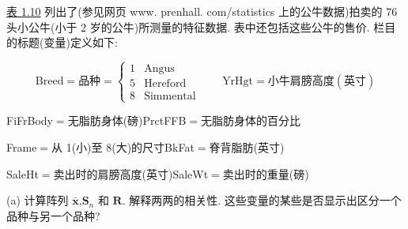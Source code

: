  \hyperref[tab:1.10]{表 1.10} 列出了(参见网页 www. prenhall. com/statistics 上的公牛数据)拍卖的 76 头小公牛(小于 2 岁的公牛)所测量的特征数据. 表中还包括这些公牛的售价. 栏目的标题(变量)定义如下:

\[
\mathrm{Breed}=\text{品种}=\begin{cases} 1 & \text{Angus} \\ 5 & \text{Hereford} \\ 8 & \text{Simmental} \end{cases} \qquad \text{YrHgt}=\text{小牛肩膀高度}(\text{英寸})
\]

FiFrBody$=$无脂肪身体(磅)\quad PrctFFB$=$无脂肪身体的百分比

Frame$=$从 1(小)至 8(大)的尺寸\quad BkFat$=$脊背脂肪(英寸)

SaleHt$=$卖出时的肩膀高度(英寸)\quad SaleWt$=$卖出时的重量(磅)

(a) 计算阵列 $\bar{\bm{x}}$,$\bm{S}_n$ 和 $\bm{R}$. 解释两两的相关性. 这些变量的某些是否显示出区分一个品种与另一个品种?
